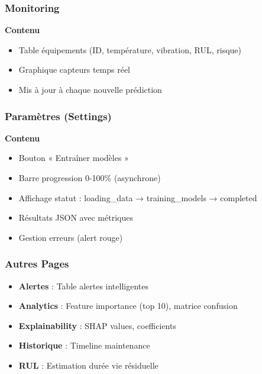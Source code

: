 \documentclass[12pt,a4paper,french]{article}
\begin{document}
\subsubsection{Monitoring}

\begin{center}
\textbf{Contenu}
\end{center}

\begin{itemize}
    \item Table équipements (ID, température, vibration, RUL, risque)
    \item Graphique capteurs temps réel
    \item Mis à jour à chaque nouvelle prédiction
\end{itemize}

\subsubsection{Paramètres (Settings)}

\begin{center}
\textbf{Contenu}
\end{center}

\begin{itemize}
    \item Bouton « Entraîner modèles »
    \item Barre progression 0-100\% (asynchrone)
    \item Affichage statut : loading\_data → training\_models → completed
    \item Résultats JSON avec métriques
    \item Gestion erreurs (alert rouge)
\end{itemize}

\subsubsection{Autres Pages}

\begin{itemize}
    \item \textbf{Alertes} : Table alertes intelligentes
    \item \textbf{Analytics} : Feature importance (top 10), matrice confusion
    \item \textbf{Explainability} : SHAP values, coefficients
    \item \textbf{Historique} : Timeline maintenance
    \item \textbf{RUL} : Estimation durée vie résiduelle
\end{itemize}
\end{document}
